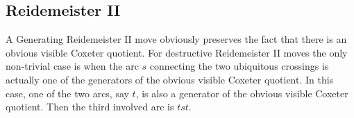 \documentclass{article}\usepackage{amsthm}
\begin{document}
\subsection{Reidemeister II}
A Generating Reidemeister II move obviously preserves the fact that there is an obvious visible Coxeter quotient. For destructive Reidemeister II moves the only non-trivial case is when the arc $s$ connecting the two ubiquitous crossings is actually one of the generators of the obvious visible Coxeter quotient. In this case, one of the two arcs, say $t$, is also a generator of the obvious visible Coxeter quotient. Then the third involved arc is $tst$. 
\end{document}
